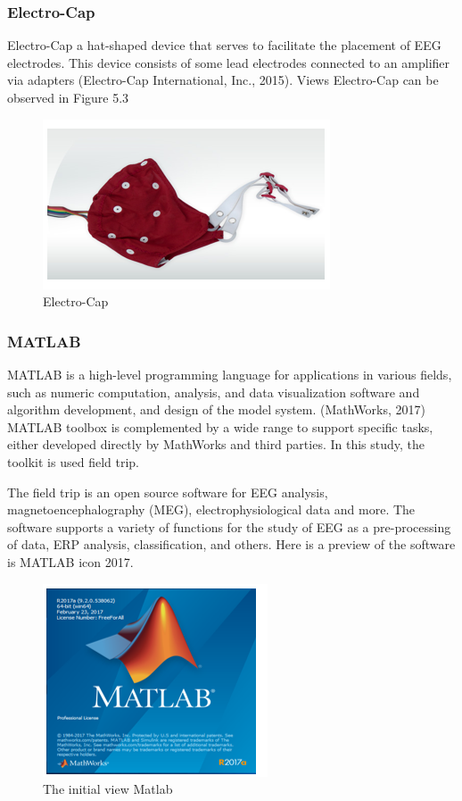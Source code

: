 \subsubsection{ Electro-Cap}
\par
Electro-Cap a hat-shaped device that serves to facilitate the placement of EEG electrodes. This device consists of some lead electrodes connected to an amplifier via adapters (Electro-Cap International, Inc., 2015). Views Electro-Cap can be observed in Figure 5.3
\begin{figure}[h!]
\centering
\includegraphics[scale=0.5]{figures/53.PNG}
\caption{Electro-Cap}
\label{labelgambar7}
\end{figure}

\subsubsection{MATLAB}
\par
MATLAB is a high-level programming language for applications in various fields, such as numeric computation, analysis, and data visualization software and algorithm development, and design of the model system. (MathWorks, 2017) MATLAB toolbox is complemented by a wide range to support specific tasks, either developed directly by MathWorks and third parties. In this study, the toolkit is used field trip.

\par
The field trip is an open source software for EEG analysis, magnetoencephalography (MEG), electrophysiological data and more. The software supports a variety of functions for the study of EEG as a pre-processing of data, ERP analysis, classification, and others. Here is a preview of the software is MATLAB icon 2017.
\begin{figure}[h!]
\centering
\includegraphics[scale=0.6]{figures/54.PNG}
\caption{The initial view Matlab}
\label{labelgambar8}
\end{figure}

